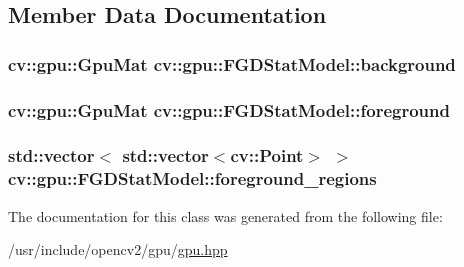 \subsection{Member Data Documentation}
\hypertarget{classcv_1_1gpu_1_1FGDStatModel_a5338d077962abc68f3bdf86dbfdf7fb5}{
\subsubsection[{background}]{\setlength{\rightskip}{0pt plus 5cm}cv\-::gpu\-::\-Gpu\-Mat cv\-::gpu\-::\-F\-G\-D\-Stat\-Model\-::background}}\label{classcv_1_1gpu_1_1FGDStatModel_a5338d077962abc68f3bdf86dbfdf7fb5}
\hypertarget{classcv_1_1gpu_1_1FGDStatModel_a45433418635a48e18f1faefca63b2d19}{
\subsubsection[{foreground}]{\setlength{\rightskip}{0pt plus 5cm}cv\-::gpu\-::\-Gpu\-Mat cv\-::gpu\-::\-F\-G\-D\-Stat\-Model\-::foreground}}\label{classcv_1_1gpu_1_1FGDStatModel_a45433418635a48e18f1faefca63b2d19}
\hypertarget{classcv_1_1gpu_1_1FGDStatModel_a8ebaaacff6c039db9c53d60640102243}{
\subsubsection[{foreground\-\_\-regions}]{\setlength{\rightskip}{0pt plus 5cm}std\-::vector$<$ std\-::vector$<$cv\-::\-Point$>$ $>$ cv\-::gpu\-::\-F\-G\-D\-Stat\-Model\-::foreground\-\_\-regions}}\label{classcv_1_1gpu_1_1FGDStatModel_a8ebaaacff6c039db9c53d60640102243}


The documentation for this class was generated from the following file\-:\begin{DoxyCompactItemize}
\item 
/usr/include/opencv2/gpu/\hyperlink{gpu_2gpu_8hpp}{gpu.\-hpp}\end{DoxyCompactItemize}
